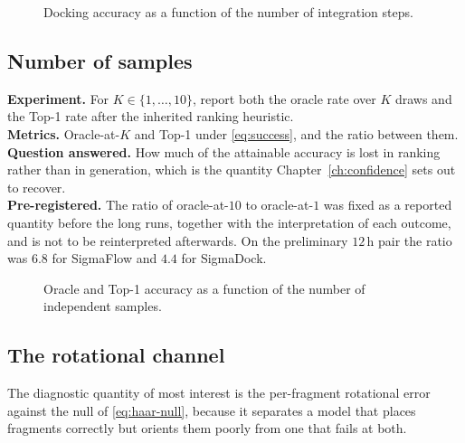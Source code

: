 \documentclass[11pt,a4paper]{report}
\theoremstyle{plain}
\theoremstyle{definition}
\theoremstyle{remark}
\newif\ifdraftmode
\newenvironment{reserved}[1]{%
    \begin{tcolorbox}[
      enhanced, breakable,
      colback=PanelGrey, colframe=DraftBlue,
      boxrule=0.5pt, left=6pt,right=6pt,top=5pt,bottom=5pt,
      fonttitle=\bfseries\small\sffamily,
      title={RESERVED \textendash\ #1}]
      \small\sffamily
  }{%
    \end{tcolorbox}
  }
\newenvironment{reserved}[1]{\setbox0=\vbox\bgroup}{\egroup}
\newcommand{\figplaceholder}[3]{%
  \begin{figure}[htbp]
  \centering
  \ifdraftmode
    \begin{tcolorbox}[
      width=0.92\textwidth, colback=PanelGrey, colframe=DraftGrey,
      boxrule=0.5pt, sharp corners, halign=flush left]
      \small\sffamily
      \textbf{\color{DraftBlue}FIGURE PLACEHOLDER}\\[3pt]
      #3
    \end{tcolorbox}
  \else
    \fbox{\parbox{0.9\textwidth}{\centering\vspace{2cm}[figure]\vspace{2cm}}}
  \fi
  \caption{#2}
  \label{#1}
  \end{figure}}
\begin{document}
\figplaceholder{fig:minimal-nfe}
{Docking accuracy as a function of the number of integration steps.}
{Accuracy on the $y$ axis, number of Euler steps on a logarithmic $x$ axis,
with one line per metric in \eqref{eq:success} and a bootstrap band. Mark the
inherited default of $25$ steps with a vertical rule. If a second axis is used
for wall-clock cost per pose, take it from a clean timing run rather than from
the preliminary sweep.}

\subsection{Number of samples}
\label{sec:minimal-seeds}

\begin{reserved}{Accuracy against the number of independent samples}
\textbf{Experiment.} For $K \in \{1,\ldots,10\}$, report both the oracle rate
over $K$ draws and the Top-1 rate after the inherited ranking heuristic.\\
\textbf{Metrics.} Oracle-at-$K$ and Top-1 under \eqref{eq:success}, and the
ratio between them.\\
\textbf{Question answered.} How much of the attainable accuracy is lost in
ranking rather than in generation, which is the quantity
Chapter~\ref{ch:confidence} sets out to recover.\\
\textbf{Pre-registered.} The ratio of oracle-at-$10$ to oracle-at-$1$ was fixed
as a reported quantity before the long runs, together with the interpretation
of each outcome, and is not to be reinterpreted afterwards. On the preliminary
$12$\,h pair the ratio was $6.8$ for SigmaFlow and $4.4$ for SigmaDock.
\end{reserved}

\figplaceholder{fig:minimal-seeds}
{Oracle and Top-1 accuracy as a function of the number of independent samples.}
{Two lines per arm, oracle-at-$K$ and Top-1 after ranking, with $K$ on the $x$
axis. Shade the region between them, since that area is precisely the accuracy
that a better ranker could recover and is the motivation for
Chapter~\ref{ch:confidence}.}

\subsection{The rotational channel}
\label{sec:minimal-rotation}

The diagnostic quantity of most interest is the per-fragment rotational error
against the null of \eqref{eq:haar-null}, because it separates a model that
places fragments correctly but orients them poorly from one that fails at
both.
\end{document}
